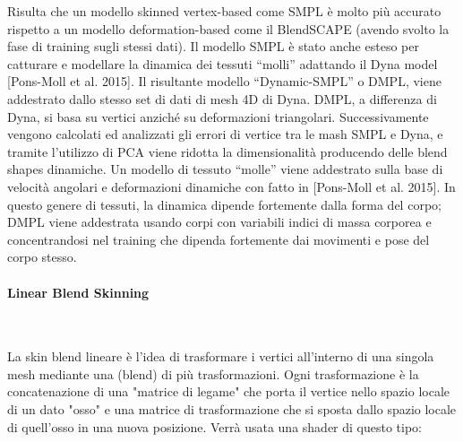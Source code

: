 \medskip

Risulta che un modello skinned vertex-based come SMPL è molto più accurato rispetto a un modello deformation-based come il BlendSCAPE (avendo svolto la fase di training sugli stessi dati).
Il modello SMPL è stato anche esteso per catturare e modellare la dinamica dei tessuti “molli” adattando il Dyna model [Pons-Moll et al. 2015].
Il risultante modello “Dynamic-SMPL” o DMPL, viene addestrato dallo stesso set di dati di mesh 4D di Dyna. DMPL, a differenza di Dyna, si basa su vertici anziché su deformazioni triangolari. Successivamente vengono calcolati ed analizzati gli errori di vertice tra le mash SMPL e Dyna, e tramite l’utilizzo di PCA viene ridotta la dimensionalità producendo delle blend shapes dinamiche. Un modello di tessuto “molle” viene addestrato sulla base di velocità angolari e deformazioni dinamiche con fatto in [Pons-Moll et al. 2015]. In questo genere di tessuti, la dinamica dipende fortemente dalla forma del corpo; DMPL viene addestrata usando corpi con variabili indici di massa corporea e concentrandosi nel training che dipenda fortemente dai movimenti e pose del corpo stesso.

\newpage

\paragraph{Linear Blend Skinning}~

\medskip

La skin blend lineare è l'idea di trasformare i vertici all'interno di una singola mesh mediante una (blend) di più trasformazioni. Ogni trasformazione è la concatenazione di una "matrice di legame" che porta il vertice nello spazio locale di un dato "osso" e una matrice di trasformazione che si sposta dallo spazio locale di quell'osso in una nuova posizione.
Verrà usata una shader di questo tipo:

\medskip


